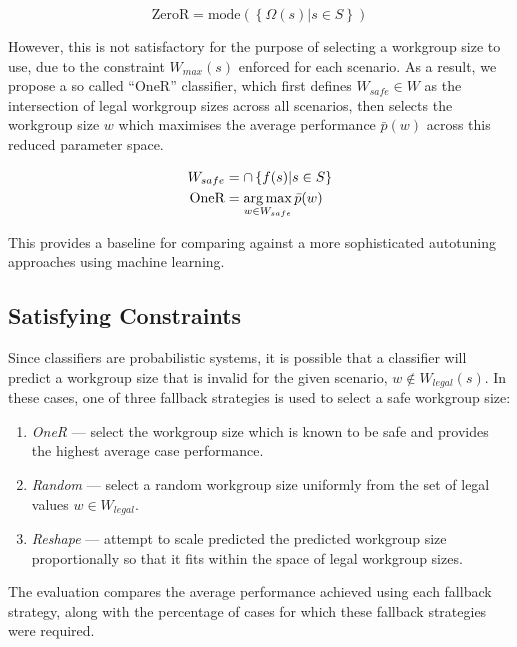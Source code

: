 \begin{equation}
\text{ZeroR} = \text{mode}( \left\{ \Omega(s) | s \in S \right\} )
\end{equation}

However, this is not satisfactory for the purpose of selecting a
workgroup size to use, due to the constraint $W_{max}(s)$ enforced for
each scenario. As a result, we propose a so called ``OneR''
classifier, which first defines $W_{safe} \in W$ as the intersection
of legal workgroup sizes across all scenarios, then selects the
workgroup size $w$ which maximises the average performance
$\bar{p}(w)$ across this reduced parameter space.

\begin{align}
W_{safe} &= \cap \left\{ f(s) | s \in S \right\} \\
\text{OneR} &= \operatorname*{arg\,max}_{w \in W_{safe}} \bar{p}(w)
\end{align}

This provides a baseline for comparing against a more sophisticated
autotuning approaches using machine learning.

\subsection{Satisfying Constraints}

Since classifiers are probabilistic systems, it is possible that a
classifier will predict a workgroup size that is invalid for the given
scenario, $w \not\in W_{legal}(s)$. In these cases, one of three
fallback strategies is used to select a safe workgroup size:

\begin{enumerate}
\item \emph{OneR} --- select the workgroup size which is known to be
  safe and provides the highest average case performance.
\item \emph{Random} --- select a random workgroup size uniformly from
  the set of legal values $w \in W_{legal}$.
\item \emph{Reshape} --- attempt to scale predicted the predicted
  workgroup size proportionally so that it fits within the space of
  legal workgroup sizes.
\end{enumerate}

The evaluation compares the average performance achieved using each
fallback strategy, along with the percentage of cases for which these
fallback strategies were required.

